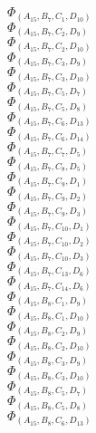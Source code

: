 \documentclass[14pt]{article}
\begin{document}
    $\Phi_{({A}_{15}, {B}_{7}, {C}_{1}, {D}_{10})}$ \\ 
    $\Phi_{({A}_{15}, {B}_{7}, {C}_{2}, {D}_{9})}$ \\ 
    $\Phi_{({A}_{15}, {B}_{7}, {C}_{2}, {D}_{10})}$ \\ 
    $\Phi_{({A}_{15}, {B}_{7}, {C}_{3}, {D}_{9})}$ \\ 
    $\Phi_{({A}_{15}, {B}_{7}, {C}_{3}, {D}_{10})}$ \\ 
    $\Phi_{({A}_{15}, {B}_{7}, {C}_{5}, {D}_{7})}$ \\ 
    $\Phi_{({A}_{15}, {B}_{7}, {C}_{5}, {D}_{8})}$ \\ 
    $\Phi_{({A}_{15}, {B}_{7}, {C}_{6}, {D}_{13})}$ \\ 
    $\Phi_{({A}_{15}, {B}_{7}, {C}_{6}, {D}_{14})}$ \\ 
    $\Phi_{({A}_{15}, {B}_{7}, {C}_{7}, {D}_{5})}$ \\ 
    $\Phi_{({A}_{15}, {B}_{7}, {C}_{8}, {D}_{5})}$ \\ 
    $\Phi_{({A}_{15}, {B}_{7}, {C}_{9}, {D}_{1})}$ \\ 
    $\Phi_{({A}_{15}, {B}_{7}, {C}_{9}, {D}_{2})}$ \\ 
    $\Phi_{({A}_{15}, {B}_{7}, {C}_{9}, {D}_{3})}$ \\ 
    $\Phi_{({A}_{15}, {B}_{7}, {C}_{10}, {D}_{1})}$ \\ 
    $\Phi_{({A}_{15}, {B}_{7}, {C}_{10}, {D}_{2})}$ \\ 
    $\Phi_{({A}_{15}, {B}_{7}, {C}_{10}, {D}_{3})}$ \\ 
    $\Phi_{({A}_{15}, {B}_{7}, {C}_{13}, {D}_{6})}$ \\ 
    $\Phi_{({A}_{15}, {B}_{7}, {C}_{14}, {D}_{6})}$ \\ 
    $\Phi_{({A}_{15}, {B}_{8}, {C}_{1}, {D}_{9})}$ \\ 
    $\Phi_{({A}_{15}, {B}_{8}, {C}_{1}, {D}_{10})}$ \\ 
    $\Phi_{({A}_{15}, {B}_{8}, {C}_{2}, {D}_{9})}$ \\ 
    $\Phi_{({A}_{15}, {B}_{8}, {C}_{2}, {D}_{10})}$ \\ 
    $\Phi_{({A}_{15}, {B}_{8}, {C}_{3}, {D}_{9})}$ \\ 
    $\Phi_{({A}_{15}, {B}_{8}, {C}_{3}, {D}_{10})}$ \\ 
    $\Phi_{({A}_{15}, {B}_{8}, {C}_{5}, {D}_{7})}$ \\ 
    $\Phi_{({A}_{15}, {B}_{8}, {C}_{5}, {D}_{8})}$ \\ 
    $\Phi_{({A}_{15}, {B}_{8}, {C}_{6}, {D}_{13})}$ \\ 
\end{document}
